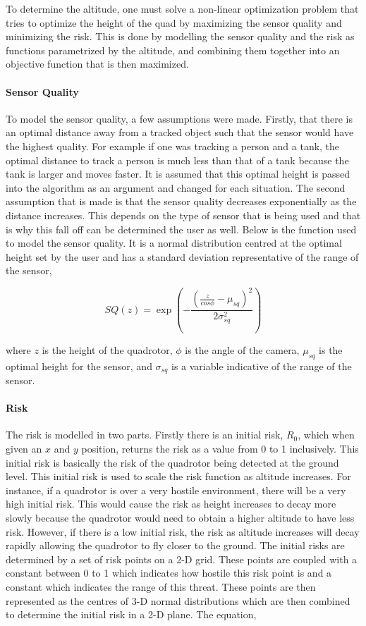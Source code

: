 \documentclass[12pt]{article}
\begin{document}
To determine the altitude, one must solve a non-linear optimization problem
that tries to optimize the height of the quad by maximizing the sensor quality
and minimizing the risk.  This is done by modelling the sensor quality and the
risk as functions parametrized by the altitude, and combining them together
into an objective function that is then maximized.

\paragraph{Sensor Quality}

To model the sensor quality, a few assumptions were made. Firstly, that there
is an optimal distance away from a tracked object such that the sensor would
have the highest quality. For example if one was tracking a person and a tank,
the optimal distance to track a person is much less than that of a tank because
the tank is larger and moves faster. It is assumed that this optimal height is
passed into the algorithm as an argument and changed for each situation. The
second assumption that is made is that the sensor quality decreases
exponentially as the distance increases. This depends on the type of sensor
that is being used and that is why this fall off can be determined the user as
well. Below is the function used to model the sensor quality. It is a normal
distribution centred at the optimal height set by the user and has a standard
deviation representative of the range of the sensor,

$$ SQ(z) = \exp{(-\frac{(\frac{z}{ cos{\phi}} -
\mu_{sq})^2}{2\sigma_{sq}^2})} $$

where $z$ is the height of the quadrotor, $\phi$ is the angle of the camera,
$\mu_{sq}$ is the optimal height for the sensor, and $\sigma_{sq}$ is a
variable indicative of the range of the sensor.

\paragraph{Risk} 

The risk is modelled in two parts. Firstly there is an initial risk, $R_0$,
which when given an $x$ and $y$ position, returns the risk as a value from 0 to
1 inclusively. This initial risk is basically the risk of the quadrotor being
detected at the ground level. This initial risk is used to scale the risk
function as altitude increases. For instance, if a quadrotor is over a very
hostile environment, there will be a very high initial risk. This would cause
the risk as height increases to decay more slowly because the quadrotor would
need to obtain a higher altitude to have less risk. However, if there is a low
initial risk, the risk as altitude increases will decay rapidly allowing the
quadrotor to fly closer to the ground. The initial risks are determined by a
set of risk points on a 2-D grid. These points are coupled with a constant
between 0 to 1 which indicates how hostile this risk point is and a constant
which indicates the range of this threat. These points are then represented as
the centres of 3-D normal distributions which are then combined to determine
the initial risk in a 2-D plane. The equation,
\end{document}
